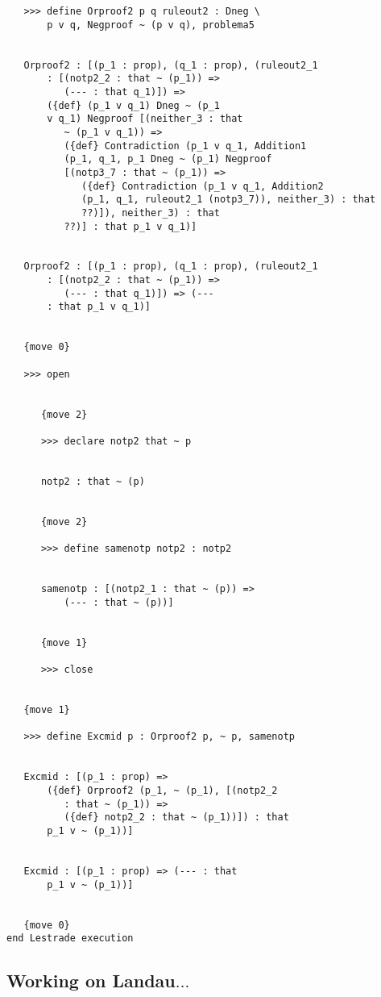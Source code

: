 \begin{verbatim}
   >>> define Orproof2 p q ruleout2 : Dneg \
       p v q, Negproof ~ (p v q), problema5


   Orproof2 : [(p_1 : prop), (q_1 : prop), (ruleout2_1 
       : [(notp2_2 : that ~ (p_1)) => 
          (--- : that q_1)]) => 
       ({def} (p_1 v q_1) Dneg ~ (p_1 
       v q_1) Negproof [(neither_3 : that 
          ~ (p_1 v q_1)) => 
          ({def} Contradiction (p_1 v q_1, Addition1 
          (p_1, q_1, p_1 Dneg ~ (p_1) Negproof 
          [(notp3_7 : that ~ (p_1)) => 
             ({def} Contradiction (p_1 v q_1, Addition2 
             (p_1, q_1, ruleout2_1 (notp3_7)), neither_3) : that 
             ??)]), neither_3) : that 
          ??)] : that p_1 v q_1)]


   Orproof2 : [(p_1 : prop), (q_1 : prop), (ruleout2_1 
       : [(notp2_2 : that ~ (p_1)) => 
          (--- : that q_1)]) => (--- 
       : that p_1 v q_1)]


   {move 0}

   >>> open


      {move 2}

      >>> declare notp2 that ~ p


      notp2 : that ~ (p)


      {move 2}

      >>> define samenotp notp2 : notp2


      samenotp : [(notp2_1 : that ~ (p)) => 
          (--- : that ~ (p))]


      {move 1}

      >>> close


   {move 1}

   >>> define Excmid p : Orproof2 p, ~ p, samenotp


   Excmid : [(p_1 : prop) => 
       ({def} Orproof2 (p_1, ~ (p_1), [(notp2_2 
          : that ~ (p_1)) => 
          ({def} notp2_2 : that ~ (p_1))]) : that 
       p_1 v ~ (p_1))]


   Excmid : [(p_1 : prop) => (--- : that 
       p_1 v ~ (p_1))]


   {move 0}
end Lestrade execution
\end{verbatim}







\subsection{Working on Landau$\ldots$}

